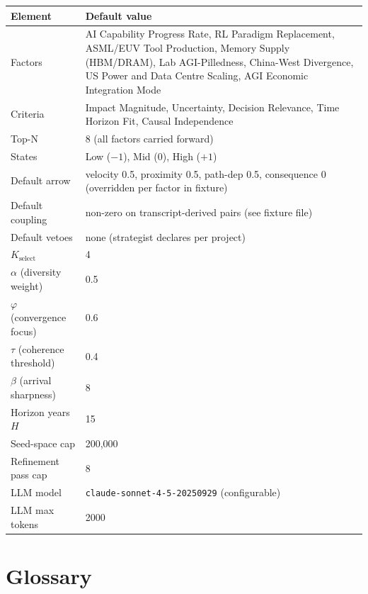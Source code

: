 \documentclass[11pt,a4paper]{article}
\begin{document}
\begin{tabularx}{\textwidth}{lX}
\toprule
\textbf{Element} & \textbf{Default value} \\
\midrule
Factors & AI Capability Progress Rate, RL Paradigm Replacement, ASML/EUV Tool Production, Memory Supply (HBM/DRAM), Lab AGI-Pilledness, China-West Divergence, US Power and Data Centre Scaling, AGI Economic Integration Mode \\
Criteria & Impact Magnitude, Uncertainty, Decision Relevance, Time Horizon Fit, Causal Independence \\
Top-N & 8 (all factors carried forward) \\
States & Low ($-1$), Mid ($0$), High ($+1$) \\
Default arrow & velocity 0.5, proximity 0.5, path-dep 0.5, consequence 0 (overridden per factor in fixture) \\
Default coupling & non-zero on transcript-derived pairs (see fixture file) \\
Default vetoes & none (strategist declares per project) \\
$K_{\text{select}}$ & 4 \\
$\alpha$ (diversity weight) & 0.5 \\
$\varphi$ (convergence focus) & 0.6 \\
$\tau$ (coherence threshold) & 0.4 \\
$\beta$ (arrival sharpness) & 8 \\
Horizon years $H$ & 15 \\
Seed-space cap & 200{,}000 \\
Refinement pass cap & 8 \\
LLM model & \texttt{claude-sonnet-4-5-20250929} (configurable) \\
LLM max tokens & 2000 \\
\bottomrule
\end{tabularx}

\section{Glossary}
\end{document}

